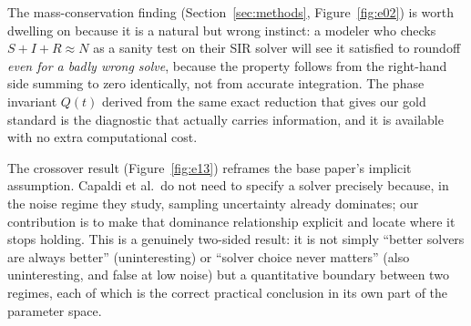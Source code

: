The mass-conservation finding (Section~\ref{sec:methods}, Figure~\ref{fig:e02}) is worth dwelling
on because it is a natural but wrong instinct: a modeler who checks $S+I+R \approx N$ as a sanity
test on their SIR solver will see it satisfied to roundoff \emph{even for a badly wrong solve},
because the property follows from the right-hand side summing to zero identically, not from
accurate integration. The phase invariant $Q(t)$ derived from the same exact reduction that gives
our gold standard is the diagnostic that actually carries information, and it is available with no
extra computational cost.

The crossover result (Figure~\ref{fig:e13}) reframes the base paper's implicit assumption. Capaldi
et al.\ do not need to specify a solver precisely because, in the noise regime they study, sampling
uncertainty already dominates; our contribution is to make that dominance relationship explicit and
locate where it stops holding. This is a genuinely two-sided result: it is not simply ``better
solvers are always better'' (uninteresting) or ``solver choice never matters'' (also uninteresting,
and false at low noise) but a quantitative boundary between two regimes, each of which is the
correct practical conclusion in its own part of the parameter space.
